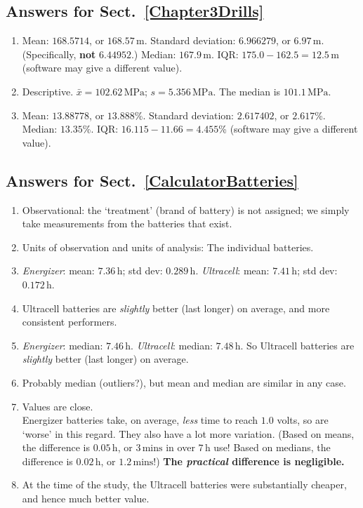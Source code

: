 \documentclass[
  11pt,
  a4paper,
  krantz2]{krantz}
\providecommand{\tightlist}{%
  \setlength{\itemsep}{0pt}\setlength{\parskip}{0pt}}
\begin{document}
\begin{footnotesize}
\subsection*{Answers for Sect.~\ref{Chapter3Drills}}\label{answers-for-sect.-refchapter3drills}

\begin{enumerate}
\def\labelenumi{\arabic{enumi}.}
\tightlist
\item
  Mean: \(168.5714\), or \(168.57\,\text{m}\).
  Standard deviation: \(6.966279\), or \(6.97\,\text{m}\).
  (Specifically, \textbf{not} \(6.44952\).)
  Median: \(167.9\,\text{m}\).
  IQR: \(175.0 - 162.5 = 12.5\,\text{m}\) (software may give a different value).
\item
  Descriptive.
  \(\bar{x} = 102.62\,\text{MPa}\); \(s = 5.356\,\text{MPa}\).
  The median is \(101.1\,\text{MPa}\).
\item
  Mean: \(13.88778\), or \(13.888\)\%.
  Standard deviation: \(2.617402\), or \(2.617\)\%.
  Median: \(13.35\)\%.
  IQR: \(16.115 - 11.66 = 4.455\)\% (software may give a different value).
\end{enumerate}

\subsection*{Answers for Sect.~\ref{CalculatorBatteries}}\label{answers-for-sect.-refcalculatorbatteries}

\begin{enumerate}
\def\labelenumi{\arabic{enumi}.}
\tightlist
\item
  Observational: the `treatment' (brand of battery) is not assigned; we simply take measurements from the batteries that exist.
\item
  Units of observation and units of analysis: The individual batteries.
\item
  \emph{Energizer}: mean: \(7.36\,\text{h}\); std dev: \(0.289\,\text{h}\).
  \emph{Ultracell}: mean: \(7.41\,\text{h}\); std dev: \(0.172\,\text{h}\).
\item
  Ultracell batteries are \emph{slightly} better (last longer) on average, and more consistent performers.
\item
  \emph{Energizer}: median: \(7.46\,\text{h}\).
  \emph{Ultracell}: median: \(7.48\,\text{h}\).
  So Ultracell batteries are \emph{slightly} better (last longer) on average.
\item
  Probably median (outliers?), but mean and median are similar in any case.
\item
  Values are close.\\
  Energizer batteries take, on average, \emph{less} time to reach \(1.0\) volts, so are `worse' in this regard.
  They also have a lot more variation.
  (Based on means, the difference is \(0.05\,\text{h}\), or \(3\,\text{mins}\) in over \(7\,\text{h}\) use!
  Based on medians, the difference is \(0.02\,\text{h}\), or \(1.2\,\text{mins}\)!)
  \textbf{The \emph{practical} difference is negligible.}
\item
  At the time of the study, the Ultracell batteries were substantially cheaper, and hence much better value.
\end{enumerate}


\end{footnotesize}
\end{document}

